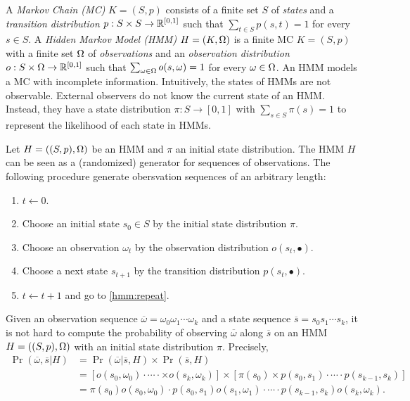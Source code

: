 
A \emph{Markov Chain (MC)} $K = (S, p)$ consists of a finite set $S$ of
\emph{states} and a \emph{transition distribution} $p : S \times S
\rightarrow \mathbb{R}^{[0, 1]}$ such that $\sum_{t \in S} p (s, t) = 1$ for every
$s \in S$.
A \emph{Hidden Markov Model (HMM)} $H = (K, \Omega)$ is a finite MC $K =
(S, p)$ with a finite set $\Omega$ of \emph{observations} and an
\emph{observation distribution} $o : S \times \Omega \rightarrow \mathbb{R}^{[0, 1]}$
such that $\sum_{\omega \in \Omega} o (s, \omega) = 1$ for every $\omega \in
\Omega$. An HMM models a MC with incomplete information. Intuitively,
the states of HMMs are not observable. External observers do not know
the current state of an HMM. Instead, they have a state distribution
$\pi : S \rightarrow [0, 1]$ with $\sum_{s \in S} \pi (s) = 1$
to represent the likelihood of each state in HMMs.

Let $H = ((S, p), \Omega)$ be an HMM and $\pi$ an initial state
distribution. The HMM $H$ can be seen as a (randomized) generator for
sequences of observations. The following procedure generate
obersvation sequences of an arbitrary length:
\begin{enumerate}
\item $t \leftarrow 0$.
\item Choose an initial state $s_0 \in S$ by the initial state
  distribution $\pi$.
\item \label{hmm:repeat}
  Choose an observation $\omega_t$ by the observation distribution
  $o (s_t, \bullet)$.
\item Choose a next state $s_{t+1}$ by the transition distribution
  $p (s_t, \bullet)$.
\item $t \leftarrow t + 1$ and go to \ref{hmm:repeat}.
\end{enumerate}

Given an observation sequence $\overline{\omega} =
\omega_0\omega_1\cdots\omega_k$ and a state sequence $\overline{s} =
s_0s_1\cdots s_k$, it is not hard to compute the probability of
observing $\overline{\omega}$ along $\overline{s}$ on an HMM $H = ((S,
p), \Omega)$ with an initial state distribution $\pi$. Precisely,
\begin{align}
  \Pr (\overline{\omega}, \overline{s} | H)
  & = \Pr (\overline{\omega} | \overline{s}, H) \times \Pr(\overline{s}, H)
    \nonumber
  \\
  & = [o (s_0, \omega_0) \cdot \cdots \cdot
    \times o (s_k, \omega_k)] \times
      [\pi (s_0) \times p (s_0, s_1) \cdot \cdots
    \cdot p (s_{k-1}, s_k)] 
    \nonumber
  \\
  & = \pi (s_0) o (s_0, \omega_0) \cdot
    p (s_0, s_1) o (s_1, \omega_1) \cdot \cdots \cdot
    p (s_{k-1}, s_k) o (s_k, \omega_k).
    \label{eqn:prob-obs-state}
\end{align}

